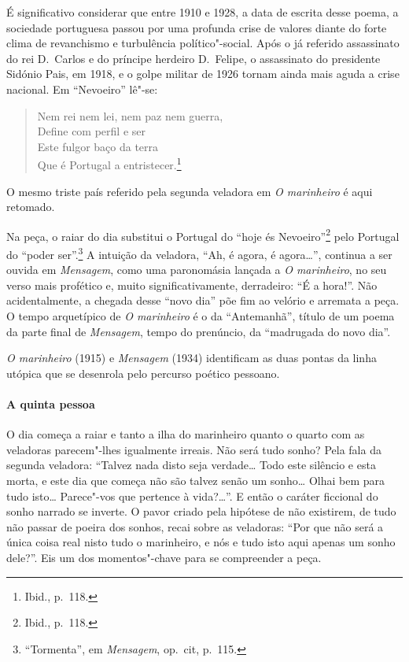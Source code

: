 É significativo considerar que entre 
1910 e 1928, a data de escrita
desse poema, a sociedade portuguesa
passou por uma profunda crise de
valores diante do forte clima de revanchismo e turbulência
político"-social. Após o já referido
assassinato do rei D.~Carlos e do
príncipe herdeiro D.~Felipe, o assassinato
do presidente Sidónio Pais,
em 1918, e o golpe militar de 1926 tornam ainda mais aguda a crise
nacional. Em “Nevoeiro” lê"-se:\EP[1]
\begin{hedraquote}
\begin{verse}
Nem rei nem lei, nem paz nem guerra,\\
Define com perfil e ser\\ 
Este fulgor baço da terra\\ 
Que é Portugal a entristecer.\footnote{ Ibid., p.~118.}
\end{verse}
\end{hedraquote}

O mesmo triste país referido
pela segunda veladora em \textit{O marinheiro} é aqui retomado. 

Na peça, o raiar do dia substitui o Portugal do “hoje és
Nevoeiro”\footnote{ Ibid., p.~118.} pelo Portugal do “poder
ser”.\footnote{ “Tormenta”, em 
\textit{Mensagem}, op.~cit, p.~115.} A
intuição da veladora, “Ah, é agora, 
é agora\ldots{}”, continua a ser ouvida
em \textit{Mensagem}, como uma paronomásia
lançada a \textit{O
marinheiro}, no seu verso mais profético e,
muito significativamente,
derradeiro: “É a hora!”. Não acidentalmente,
a chegada desse “novo dia”
põe fim ao velório e arremata a peça.
O tempo arquetípico de \textit{O
marinheiro} é o da “Antemanhã”,
título de um poema da parte final de
\textit{Mensagem}, tempo do prenúncio, da “madrugada do novo dia”. 

\textit{O marinheiro} (1915)
e \textit{Mensagem} (1934) identificam
as duas pontas da linha utópica que se
desenrola pelo percurso poético pessoano.

\paragraph{A quinta pessoa}

O dia começa a raiar e tanto a ilha
do marinheiro quanto o quarto com as
veladoras parecem"-lhes igualmente
irreais. Não será tudo sonho? Pela
fala da segunda veladora: “Talvez
nada disto seja verdade\ldots{} Todo este
silêncio e esta morta, e este dia que
começa não são talvez senão um
sonho\ldots{} Olhai bem para tudo
isto\ldots{} Parece"-vos que pertence à
vida?\ldots{}”. E então o caráter
ficcional do sonho narrado se inverte. O
pavor criado pela hipótese de não existirem, 
de tudo não passar de
poeira dos sonhos, recai sobre as
veladoras: “Por que não será a única
coisa real nisto tudo o marinheiro,
e nós e tudo isto aqui apenas um
sonho dele?”. Eis um dos momentos"-chave
para se compreender a peça. 

